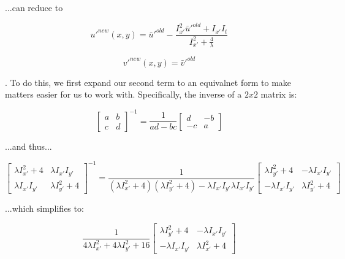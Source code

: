 \documentclass{article}
\begin{document}
\noindent ...can reduce to

\begin{equation}
    u'^{new}(x,y)=\bar{u}'^{old}- \frac{I_{x'}^2\bar{u}'^{old} + I_{x'}I_t}{I_{x'}^2+\frac{4}{\lambda}}
\end{equation}

\begin{equation}
    v'^{new}(x,y)=\bar{v}'^{old}
\end{equation}

\noindent. To do this, we first expand our second term to an equivalnet form to make matters easier for us to work with. Specifically, the inverse of a $2x2$ matrix is:

\begin{equation}
    \begin{bmatrix}
        a & b \\
        c & d
    \end{bmatrix}^{-1} =
    \frac{1}{ad-bc}
    \begin{bmatrix}
        d & -b \\
        -c & a
    \end{bmatrix}
\end{equation}

\noindent ...and thus...

\begin{equation}
    \begin{bmatrix}
        \lambda I_{x'}^2 + 4 & \lambda I_{x'} I_{y'} \\
        \lambda I_{x'} I_{y'} & \lambda I_{y'}^2 + 4
    \end{bmatrix}^{-1} =
    \frac{1}{(\lambda I_{x'}^2 + 4)(\lambda I_{y'}^2 + 4)- \lambda I_{x'} I_{y'} \lambda I_{x'} I_{y'}}
    \begin{bmatrix}
        \lambda I_{y'}^2 + 4 & -\lambda I_{x'} I_{y'} \\
        -\lambda I_{x'} I_{y'} & \lambda I_{y'}^2 + 4
    \end{bmatrix}
\end{equation}

\noindent ...which simplifies to:

\begin{equation}
    \frac{1}{4 \lambda I_{x'}^2 + 4\lambda I_{y'}^2 + 16}
    \begin{bmatrix}
        \lambda I_{y'}^2 + 4 & -\lambda I_{x'} I_{y'} \\
        -\lambda I_{x'} I_{y'} & \lambda I_{x'}^2 + 4
    \end{bmatrix}
\end{equation}
\end{document}
